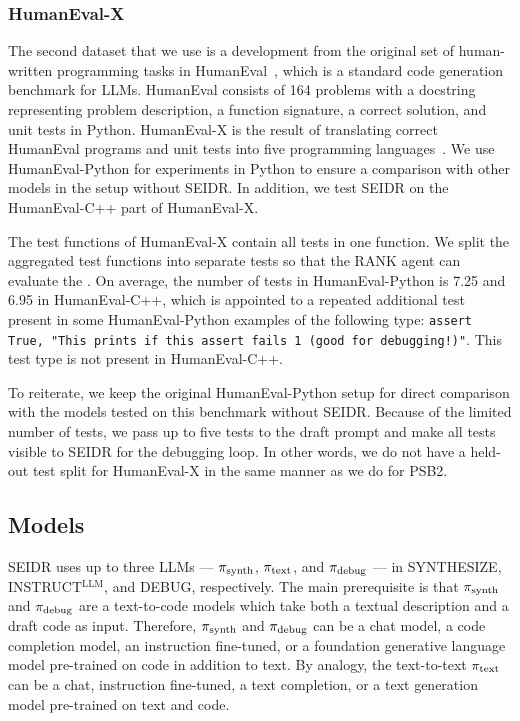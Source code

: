 \subsubsection{HumanEval-X}
The second dataset that we use is a development from the original set of human-written programming tasks in HumanEval~\cite{chenEvaluatingLargeLanguage2021}, which is a standard code generation benchmark for LLMs.
HumanEval consists of 164 problems with a docstring representing problem description, a function signature, a correct solution, and unit tests in Python. 
HumanEval-X is the result of translating correct HumanEval programs and unit tests into five programming languages~\cite{zheng2023:codegeex}. 
We use HumanEval-Python for experiments in Python to ensure a comparison with other models in the setup without SEIDR. 
In addition, we test SEIDR on the HumanEval-C++ part of HumanEval-X. %

The test functions of HumanEval-X contain all tests in one function. We split the aggregated test functions into separate tests so that the RANK agent can evaluate the . 
On average, the number of tests in HumanEval-Python is 7.25 and 6.95 in HumanEval-C++, which is appointed to a repeated additional test present in some HumanEval-Python examples of the following type: \texttt{assert True, "This prints if this assert fails 1 (good for debugging!)"}.
This test type is not present in HumanEval-C++.

To reiterate, we keep the original HumanEval-Python setup for direct comparison with the models tested on this benchmark without SEIDR. 
Because of the limited number of tests, we pass up to five tests to the draft prompt and make all tests visible to SEIDR for the debugging loop. 
In other words, we do not have a held-out test split for HumanEval-X in the same manner as we do for PSB2.


\subsection{Models}
\label{sec:seidr-models}

SEIDR uses up to three LLMs --- $ \pi_\text{synth} $, $ \pi_\text{text} $, and $ \pi_\text{debug} $ ---
in SYNTHESIZE, INSTRUCT$^{\text{LLM}}$, and DEBUG, respectively. 
The main prerequisite is that $ \pi_\text{synth} $ and $ \pi_\text{debug} $ are a text-to-code models which take both a textual description and a draft code as input.
Therefore, $ \pi_\text{synth} $ and $ \pi_\text{debug} $ can be a chat model, a code completion model, an instruction fine-tuned, or a foundation generative language model pre-trained on code in addition to text. 
By analogy, the text-to-text $ \pi_\text{text} $ can be a chat, instruction fine-tuned, a text completion, or a text generation model pre-trained on text and code.

